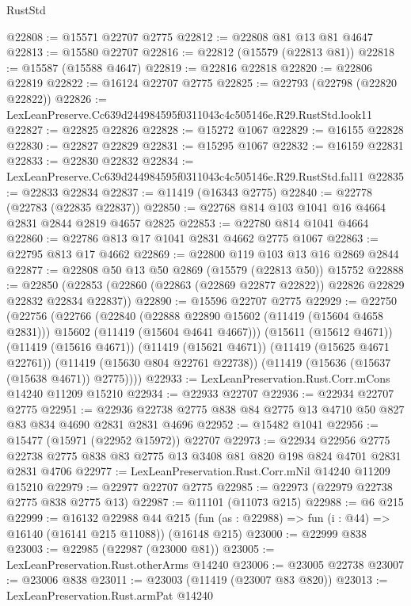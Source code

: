 \begin{lexlean}{RustStd}
\begin{coremodule}
@22808 := @15571 @22707 @2775
@22812 := @22808 @81 @13 @81 @4647
@22813 := @15580 @22707
@22816 := @22812 (@15579 (@22813 @81))
@22818 := @15587 (@15588 @4647)
@22819 := @22816 @22818
@22820 := @22806 @22819
@22822 := @16124 @22707 @2775
@22825 := @22793 (@22798 (@22820 @22822))
@22826 := LexLeanPreserve.Cc639d244984595f0311043c4c505146e.R29.RustStd.look11
@22827 := @22825 @22826
@22828 := @15272 @1067
@22829 := @16155 @22828
@22830 := @22827 @22829
@22831 := @15295 @1067
@22832 := @16159 @22831
@22833 := @22830 @22832
@22834 := LexLeanPreserve.Cc639d244984595f0311043c4c505146e.R29.RustStd.fal11
@22835 := @22833 @22834
@22837 := @11419 (@16343 @2775)
@22840 := @22778 (@22783 (@22835 @22837))
@22850 := @22768 @814 @103 @1041 @16 @4664 @2831 @2844 @2819 @4657 @2825
@22853 := @22780 @814 @1041 @4664
@22860 := @22786 @813 @17 @1041 @2831 @4662 @2775 @1067
@22863 := @22795 @813 @17 @4662
@22869 := @22800 @119 @103 @13 @16 @2869 @2844
@22877 := @22808 @50 @13 @50 @2869 (@15579 (@22813 @50)) @15752
@22888 := @22850
    (@22853 (@22860 (@22863 (@22869 @22877 @22822)) @22826 @22829 @22832 @22834 @22837))
@22890 := @15596 @22707 @2775
@22929 := @22750
    (@22756
      (@22766
        (@22840
          (@22888 @22890 @15602 (@11419 (@15604 @4658 @2831)))
          @15602
          (@11419 (@15604 @4641 @4667)))
        (@15611 (@15612 @4671))
        (@11419 (@15616 @4671))
        (@11419 (@15621 @4671))
        (@11419 (@15625 @4671 @22761))
        (@11419 (@15630 @804 @22761 @22738))
        (@11419 (@15636 (@15637 (@15638 @4671)) @2775))))
@22933 := LexLeanPreservation.Rust.Corr.mCons @14240 @11209 @15210
@22934 := @22933 @22707
@22936 := @22934 @22707 @2775
@22951 := @22936 @22738 @2775 @838 @84 @2775 @13 @4710 @50 @827 @83 @834 @4690 @2831 @2831 @4696
@22952 := @15482 @1041
@22956 := @15477 (@15971 (@22952 @15972)) @22707
@22973 := @22934
    @22956
    @2775
    @22738
    @2775
    @838
    @83
    @2775
    @13
    @3408
    @81
    @820
    @198
    @824
    @4701
    @2831
    @2831
    @4706
@22977 := LexLeanPreservation.Rust.Corr.mNil @14240 @11209 @15210
@22979 := @22977 @22707 @2775
@22985 := @22973 (@22979 @22738 @2775 @838 @2775 @13)
@22987 := @11101 (@11073 @215)
@22988 := @6 @215
@22999 := @16132
    @22988
    @44
    @215
    (fun (as : @22988) => fun (i : @44) => @16140 (@16141 @215 @11088))
    (@16148 @215)
@23000 := @22999 @838
@23003 := @22985 (@22987 (@23000 @81))
@23005 := LexLeanPreservation.Rust.otherArms @14240
@23006 := @23005 @22738
@23007 := @23006 @838
@23011 := @23003 (@11419 (@23007 @83 @820))
@23013 := LexLeanPreservation.Rust.armPat @14240

\end{coremodule}
\end{lexlean}
